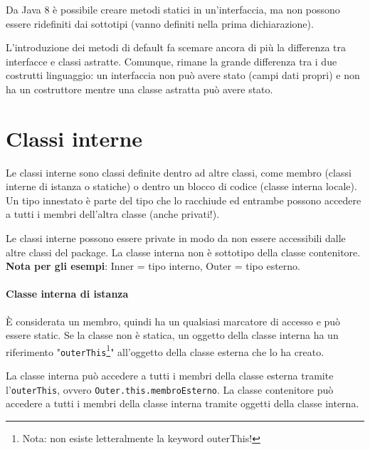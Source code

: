 Da Java 8 è possibile creare metodi statici in un'interfaccia, ma non possono essere ridefiniti dai sottotipi (vanno definiti nella prima dichiarazione).

L’introduzione dei metodi di default fa scemare ancora di pi\`u la differenza tra interfacce e classi astratte. Comunque, rimane la grande differenza tra i due costrutti linguaggio: un interfaccia non pu\`o avere stato (campi dati propri) e non ha un costruttore mentre una classe astratta pu\`o avere stato.

\section{Classi interne}
Le classi interne sono classi definite dentro ad altre classi, come membro (classi interne di istanza o statiche) o dentro un blocco di codice (classe interna locale). Un tipo innestato è parte del tipo che lo racchiude ed entrambe possono accedere a tutti i membri dell'altra classe (anche privati!).

Le classi interne possono essere private in modo da non essere accessibili dalle altre classi del package.
La classe interna non è sottotipo della classe contenitore. \\
\textbf{Nota per gli esempi}: Inner = tipo interno, Outer = tipo esterno.

\paragraph{Classe interna di istanza}
È considerata un membro, quindi ha un qualsiasi marcatore di accesso e può essere static. Se la classe non è statica, un oggetto della classe interna ha un riferimento "\texttt{outerThis}\footnote{Nota: non esiste letteralmente la keyword outerThis!}" all'oggetto della classe esterna che lo ha creato.

La classe interna può accedere a tutti i membri della classe esterna tramite l'\texttt{outerThis}, ovvero \texttt{Outer.this.membroEsterno}.
La classe contenitore può accedere a tutti i membri della classe interna tramite oggetti della classe interna.

